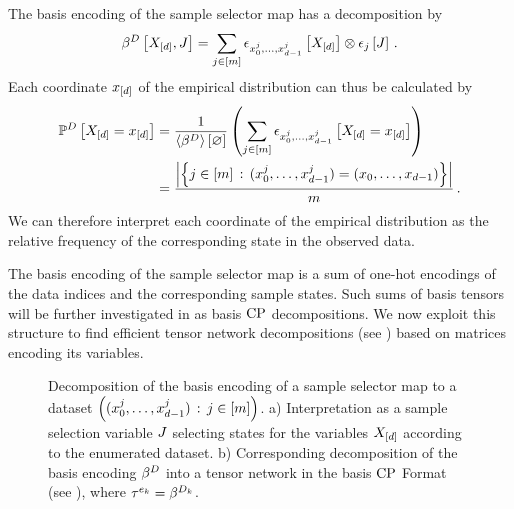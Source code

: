 The basis encoding of the sample selector map has a decomposition by
\begin{align*}
    \beta^{D}\left[X_{[d]},J\right]
    = \sum_{j\in[m]} \epsilon_{{x_{0}^{j},\ldots,x_{d-1}^{j}}}\left[X_{[d]}\right] \otimes \epsilon_{j}\left[J\right] \, .
\end{align*}
Each coordinate $x_{[d]}$ of the empirical distribution can thus be calculated by
\begin{align*}
    \mathbb{P}^{D}\left[X_{[d]}=x_{[d]}\right]
    & = \frac{1}{\left\langle \beta^{D}\right\rangle \left[ \varnothing \right]} \left( \sum_{j\in[m]} \epsilon_{{x_{0}^{j},\ldots,x_{d-1}^{j}}}\left[X_{[d]}=x_{[d]}\right]  \right) \\
    &= \frac{\left|\left\{j\in[m] \,:\, ({x_{0}^{j},\ldots,x_{d-1}^{j}}) = (x_{0},\ldots,x_{d-1})\right\}\right|}{m} \, .
\end{align*}
We can therefore interpret each coordinate of the empirical distribution as the relative frequency of the corresponding state in the observed data.

The basis encoding of the sample selector map is a sum of one-hot encodings of the data indices and the corresponding sample states.
Such sums of basis tensors will be further investigated in  as basis $\mathrm{CP}$ decompositions.
We now exploit this structure to find efficient tensor network decompositions (see ) based on matrices encoding its variables.


\begin{figure}[t]
    \begin{center}
        
    \end{center}
    \caption{
        Decomposition of the basis encoding of a sample selector map to a dataset $\left(({x_{0}^{j},\ldots,x_{d-1}^{j}})\,:\,j\in[m]\right)$.
        a) Interpretation as a sample selection variable $J$ selecting states for the variables $X_{[d]}$ according to the enumerated dataset.
        b) Corresponding decomposition of the basis encoding $\beta^{D}$ into a tensor network in the basis $\mathrm{CP}$ Format (see ), where $\tau^{e_{k}}=\beta^{D_{k}}$.
    }
    \label{fig:DataDecomposition}
\end{figure}


